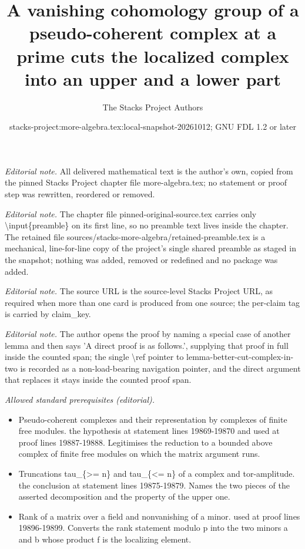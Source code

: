 \documentclass[10pt,a4paper]{amsart}
\title{A vanishing cohomology group of a pseudo-coherent complex at a prime cuts the localized complex into an upper and a lower part}
\author{The Stacks Project Authors}
\date{stacks-project:more-algebra.tex:local-snapshot-20261012; GNU FDL 1.2 or later}
\theoremstyle{plain}
\theoremstyle{definition}
\theoremstyle{remark}
\numberwithin{equation}{subsection}
\begin{document}
\maketitle
\setcounter{subsection}{1}
\noindent\textit{Editorial note.} All delivered mathematical text is the author's own, copied from the pinned Stacks Project chapter file more-algebra.tex; no statement or proof step was rewritten, reordered or removed.\par\medskip
\noindent\textit{Editorial note.} The chapter file pinned-original-source.tex carries only \textbackslash{}input\{preamble\} on its first line, so no preamble text lives inside the chapter. The retained file sources/stacks-more-algebra/retained-preamble.tex is a mechanical, line-for-line copy of the project's single shared preamble as staged in the snapshot; nothing was added, removed or redefined and no package was added.\par\medskip
\noindent\textit{Editorial note.} The source URL is the source-level Stacks Project URL, as required when more than one card is produced from one source; the per-claim tag is carried by claim\_key.\par\medskip
\noindent\textit{Editorial note.} The author opens the proof by naming a special case of another lemma and then says 'A direct proof is as follows.', supplying that proof in full inside the counted span; the single \textbackslash{}ref pointer to lemma-better-cut-complex-in-two is recorded as a non-load-bearing navigation pointer, and the direct argument that replaces it stays inside the counted proof span.\par\medskip
\noindent\textit{Allowed standard prerequisites (editorial).}\begin{itemize}
\item Pseudo-coherent complexes and their representation by complexes of finite free modules. the hypothesis at statement lines 19869-19870 and used at proof lines 19887-19888. Legitimises the reduction to a bounded above complex of finite free modules on which the matrix argument runs.
\item Truncations tau\_\{>= n\} and tau\_\{<= n\} of a complex and tor-amplitude. the conclusion at statement lines 19875-19879. Names the two pieces of the asserted decomposition and the property of the upper one.
\item Rank of a matrix over a field and nonvanishing of a minor. used at proof lines 19896-19899. Converts the rank statement modulo p into the two minors a and b whose product f is the localizing element.
\end{itemize}\medskip
\end{document}

